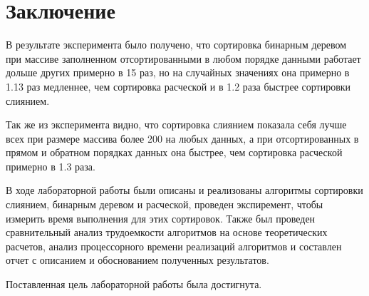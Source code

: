 \chapter*{Заключение}


В результате эксперимента было получено, что сортировка бинарным деревом при массиве заполненном отсортированными в любом порядке данными работает дольше других примерно в 15 раз, но на случайных значениях она примерно в 1.13 раз медленнее, чем сортировка расческой и в 1.2 раза быстрее сортировки слиянием.

Так же из эксперимента видно, что сортировка слиянием показала себя лучше всех при размере массива более 200 на любых данных, а при отсортированных в прямом и обратном порядках данных она быстрее, чем сортировка расческой примерно в 1.3 раза.

В ходе лабораторной работы были описаны и реализованы алгоритмы сортировки слиянием, бинарным деревом и расческой, проведен экспиремент, чтобы измерить время выполнения для этих сортировок. Также был проведен сравнительный анализ трудоемкости алгоритмов на основе теоретических расчетов, анализ процессорного времени реализаций алгоритмов и составлен отчет с описанием и обоснованием полученных результатов.

Поставленная цель лабораторной работы была достигнута.